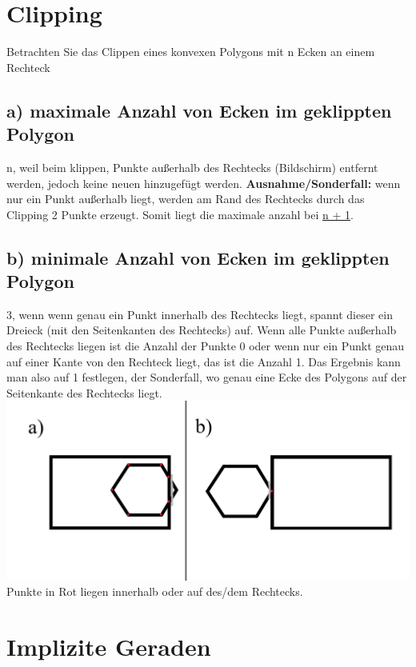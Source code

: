 \documentclass{article}
\begin{document}
\section{Clipping}

Betrachten Sie das Clippen eines konvexen Polygons mit n Ecken an einem Rechteck

\subsection*{a) maximale Anzahl von Ecken im geklippten Polygon}
n, weil beim klippen, Punkte außerhalb des Rechtecks (Bildschirm) entfernt werden, jedoch keine neuen hinzugefügt werden. \textbf{Ausnahme/Sonderfall:} wenn nur ein Punkt außerhalb liegt, werden am Rand des Rechtecks durch das Clipping 2 Punkte erzeugt. Somit liegt die maximale anzahl bei \underline{n + 1}.

\subsection*{b) minimale Anzahl von Ecken im geklippten Polygon}
3, wenn wenn genau ein Punkt innerhalb des Rechtecks liegt, spannt dieser ein Dreieck (mit den Seitenkanten des Rechtecks) auf. Wenn alle Punkte außerhalb des Rechtecks liegen ist die Anzahl der Punkte 0 oder wenn nur ein Punkt genau auf einer Kante von den Rechteck liegt, das ist die Anzahl 1.
Das Ergebnis kann man also auf 1 festlegen, der Sonderfall, wo genau eine Ecke des Polygons auf der Seitenkante des Rechtecks liegt.
\\
\includegraphics[width=400pt]{./files/Übung10.3.png}
\\
Punkte in Rot liegen innerhalb oder auf des/dem Rechtecks.

\section{Implizite Geraden}
\end{document}
